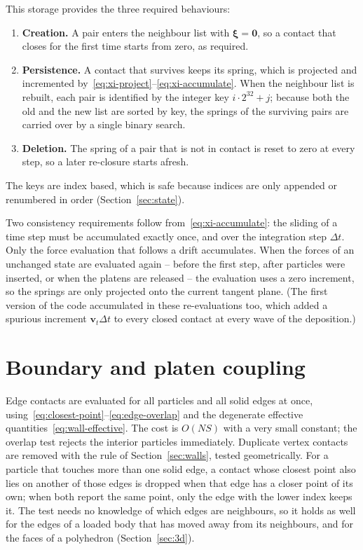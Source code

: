 This storage provides the three required behaviours:
\begin{enumerate}[leftmargin=2.2em]
  \item \textbf{Creation.}  A pair enters the neighbour list with
        $\boldsymbol{\xi}=\mathbf{0}$, so a contact that closes for the first
        time starts from zero, as required.
  \item \textbf{Persistence.}  A contact that survives keeps its spring, which
        is projected and incremented
        by~\eqref{eq:xi-project}--\eqref{eq:xi-accumulate}.  When the neighbour
        list is rebuilt, each pair is identified by the integer key
        $i\cdot 2^{32}+j$; because both the old and the new list are sorted by
        key, the springs of the surviving pairs are carried over by a single
        binary search.
  \item \textbf{Deletion.}  The spring of a pair that is not in contact is reset
        to zero at every step, so a later re-closure starts afresh.
\end{enumerate}
The keys are index based, which is safe because indices are only appended or
renumbered in order (Section~\ref{sec:state}).

Two consistency requirements follow from~\eqref{eq:xi-accumulate}: the sliding
of a time step must be accumulated exactly once, and over the integration step
$\Delta t$.  Only the force evaluation that follows a drift accumulates.  When
the forces of an unchanged state are evaluated again -- before the first step,
after particles were inserted, or when the platens are released -- the
evaluation uses a zero increment, so the springs are only projected onto the
current tangent plane.  (The first version of the code accumulated in these
re-evaluations too, which added a spurious increment
$\mathbf{v}_{t}\Delta t$ to every closed contact at every wave of the
deposition.)

\section{Boundary and platen coupling}
\label{sec:coupling}

Edge contacts are evaluated for all particles and all solid edges at once,
using~\eqref{eq:closest-point}--\eqref{eq:edge-overlap} and the degenerate
effective quantities~\eqref{eq:wall-effective}.  The cost is $O(NS)$ with a very
small constant; the overlap test rejects the interior particles immediately.
Duplicate vertex contacts are removed with the rule of Section~\ref{sec:walls}, tested geometrically.
For a particle that touches more than one solid edge, a contact whose closest point also lies on another of those edges is dropped when that edge has a closer point of its own; when both report the same point, only the edge with the lower index keeps it.
The test needs no knowledge of which edges are neighbours, so it holds as well for the edges of a loaded body that has moved away from its neighbours, and for the faces of a polyhedron (Section~\ref{sec:3d}).

